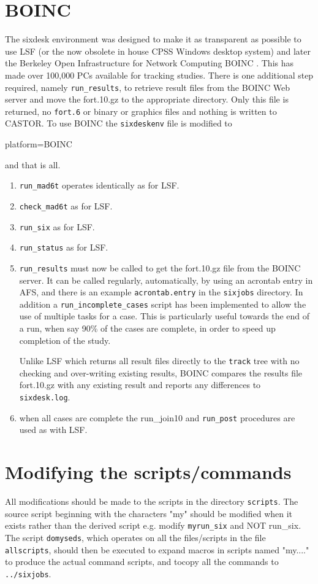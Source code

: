 \documentclass{cernatsnote}    %
\begin{document}
\section{BOINC}
The sixdesk environment was designed to make it as transparent as possible
to use LSF (or the now obsolete in house CPSS Windows desktop system) and later the 
Berkeley Open Infrastructure for Network Computing BOINC \cite{Boinc}.
This has made over 100,000 PCs available for tracking studies.
There is one additional step required, namely {\tt run\_results}, to
retrieve result files from the BOINC Web server 
and move the fort.10.gz to the appropriate directory.
Only this file is returned, no {\tt fort.6} or binary
or graphics files and nothing is written to CASTOR.
To use BOINC the {\tt sixdeskenv} file is modified to
\begin{description}
\item[platform=BOINC]
\end{description}
and that is all.
\begin{enumerate}
\item {\tt run\_mad6t} operates identically as for LSF.
\item {\tt check\_mad6t} as for LSF.
\item {\tt run\_six} as for LSF. 
\item {\tt run\_status} as for LSF. 
\item {\tt run\_results} must now be called to get the fort.10.gz file from the
BOINC server. It can be called regularly, automatically, by using an acrontab
entry in AFS, and there is an example {\tt acrontab.entry} in the {\tt sixjobs}
directory. In addition a {\tt run\_incomplete\_cases} script has been implemented to
allow the use of multiple tasks for a case. This is particularly useful  
towards the end of a run,
when say 90\% of the cases are complete, in order 
to speed up completion of the study.

Unlike LSF which returns all result files directly to the {\tt track} tree
with no checking and over-writing existing results, BOINC 
compares the results file fort.10.gz with any existing result
and reports any differences to {\tt sixdesk.log}.
\item when all cases are complete the {run\_join10} and {\tt run\_post}
procedures are used as with LSF.
\end{enumerate}

\section{Modifying the scripts/commands}
All modifications should be made to the scripts in the directory
{\tt scripts}. The source script beginning with the characters
"my" should be modified when it exists rather than the derived script
e.g. modify {\tt myrun\_six} and NOT {run\_six}. The script {\tt domyseds},
which operates on all the files/scripts in the file {\tt allscripts},
should then be executed to expand macros in scripts named "my...." to
produce the actual command scripts, and tocopy  all the commands
to {\tt ../sixjobs}.
\end{document}
